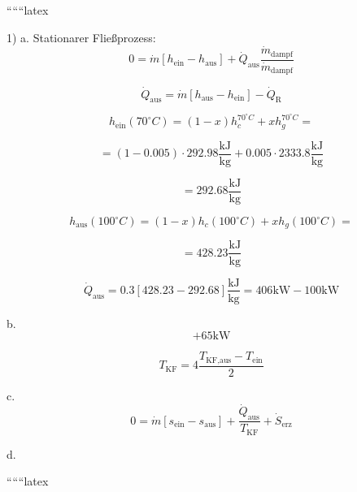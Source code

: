 
``````latex

1) a. Stationarer Fließprozess: 
\[ 0 = \dot{m} \left[ h_{\text{ein}} - h_{\text{aus}} \right] + \dot{Q}_{\text{aus}} \frac{\dot{m}_{\text{dampf}}}{\dot{m}_{\text{dampf}}} \]

\[ \dot{Q}_{\text{aus}} = \dot{m} \left[ h_{\text{aus}} - h_{\text{ein}} \right] - \dot{Q}_{\text{R}} \]

\[ h_{\text{ein}} (70^\circ C) = (1-x) h_c^{70^\circ C} + x h_g^{70^\circ C} = \]

\[ = (1-0.005) \cdot 292.98 \frac{\text{kJ}}{\text{kg}} + 0.005 \cdot 2333.8 \frac{\text{kJ}}{\text{kg}} \]

\[ = 292.68 \frac{\text{kJ}}{\text{kg}} \]

\[ h_{\text{aus}} (100^\circ C) = (1-x) h_c (100^\circ C) + x h_g (100^\circ C) = \]

\[ = 428.23 \frac{\text{kJ}}{\text{kg}} \]

\[ \dot{Q}_{\text{aus}} = 0.3 \left[ 428.23 - 292.68 \right] \frac{\text{kJ}}{\text{kg}} = 406 \text{kW} - 100 \text{kW} \]

b. 
\[ + 65 \text{kW} \]

\[ T_{\text{KF}} = 4 \frac{T_{\text{KF,aus}} - T_{\text{ein}}}{2} \]

c. 
\[ 0 = \dot{m} \left[ s_{\text{ein}} - s_{\text{aus}} \right] + \frac{\dot{Q}_{\text{aus}}}{T_{\text{KF}}} + \dot{S}_{\text{erz}} \]

d.

``````latex


